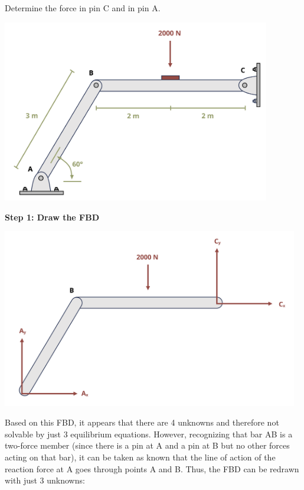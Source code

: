 \documentclass[
  letterpaper,
  DIV=11,
  numbers=noendperiod]{scrreprt}
\begin{document}
\begin{tcolorbox}[enhanced jigsaw, colbacktitle=quarto-callout-note-color!10!white, title={Example 1.2}, coltitle=black, leftrule=.75mm, rightrule=.15mm, opacityback=0, breakable, colframe=quarto-callout-note-color-frame, left=2mm, arc=.35mm, colback=white, bottomrule=.15mm, bottomtitle=1mm, toptitle=1mm, titlerule=0mm, opacitybacktitle=0.6, toprule=.15mm]

Determine the force in pin C and in pin A.

\begin{center}
\includegraphics[width=4.61458in,height=\textheight]{images/CH1 PNGs/example 1.2 part 1.png}
\end{center}

\textbf{Step 1: Draw the FBD}

\begin{center}
\includegraphics[width=5.10417in,height=\textheight]{images/CH1 PNGs/example 1.2 part 2.png}
\end{center}

Based on this FBD, it appears that there are 4 unknowns and therefore
not solvable by just 3 equilibrium equations. However, recognizing that
bar AB is a two-force member (since there is a pin at A and a pin at B
but no other forces acting on that bar), it can be taken as known that
the line of action of the reaction force at A goes through points A and
B. Thus, the FBD can be redrawn with just 3 unknowns:


\end{tcolorbox}
\end{document}

